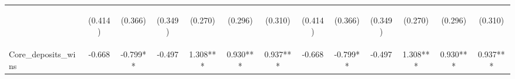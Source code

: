 \documentclass[]{article}
\begin{document}
\begin{center}
\begin{tabular}{lcccccccccccc}
\vspace{4pt} & \begin{footnotesize}(0.414)\end{footnotesize} & \begin{footnotesize}(0.366)\end{footnotesize} & \begin{footnotesize}(0.349)\end{footnotesize} & \begin{footnotesize}(0.270)\end{footnotesize} & \begin{footnotesize}(0.296)\end{footnotesize} & \begin{footnotesize}(0.310)\end{footnotesize} & \begin{footnotesize}(0.414)\end{footnotesize} & \begin{footnotesize}(0.366)\end{footnotesize} & \begin{footnotesize}(0.349)\end{footnotesize} & \begin{footnotesize}(0.270)\end{footnotesize} & \begin{footnotesize}(0.296)\end{footnotesize} & \begin{footnotesize}(0.310)\end{footnotesize} \\
Core\_deposits\_wins & -0.668 & -0.799** & -0.497 & 1.308*** & 0.930*** & 0.937*** & -0.668 & -0.799** & -0.497 & 1.308*** & 0.930*** & 0.937*** \\

\end{tabular}
\end{center}
\end{document}
